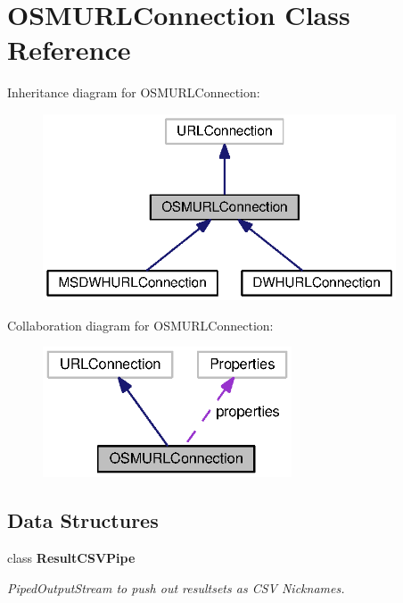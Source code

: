 \section{O\+S\+M\+U\+R\+L\+Connection Class Reference}
\label{classorg_1_1smallfoot_1_1parser_1_1osmsql_1_1OSMURLConnection}


Inheritance diagram for O\+S\+M\+U\+R\+L\+Connection\+:\nopagebreak
\begin{figure}[H]
\begin{center}
\leavevmode
\includegraphics[width=297pt]{classorg_1_1smallfoot_1_1parser_1_1osmsql_1_1OSMURLConnection__inherit__graph}
\end{center}
\end{figure}


Collaboration diagram for O\+S\+M\+U\+R\+L\+Connection\+:\nopagebreak
\begin{figure}[H]
\begin{center}
\leavevmode
\includegraphics[width=209pt]{classorg_1_1smallfoot_1_1parser_1_1osmsql_1_1OSMURLConnection__coll__graph}
\end{center}
\end{figure}
\subsection*{Data Structures}
\begin{DoxyCompactItemize}
\item 
class {\bf Result\+C\+S\+V\+Pipe}
\begin{DoxyCompactList}\small\item\em Piped\+Output\+Stream to push out resultsets as C\+S\+V Nicknames. \end{DoxyCompactList}\end{DoxyCompactItemize}
